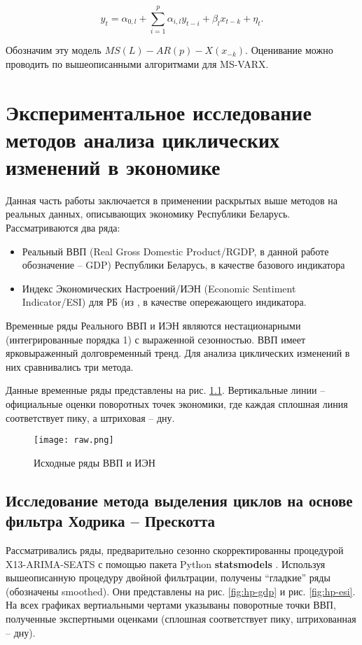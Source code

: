\documentclass[../report.tex]{subfiles}
\begin{document}
	\begin{equation}  
	\label{eq:gen-msarx}
	y_{t} = \alpha_{0,l} + \sum_{i=1}^{p} \alpha_{i,l} y_{t-i} + \beta_{l} x_{t-k} + \eta_{t}.
	\end{equation}
	
	Обозначим эту модель $MS(L)-AR(p)-X({x}_{-k})$. Оценивание можно проводить по вышеописанными алгоритмами для MS-VARX.
	
	
	\chapter{Экспериментальное исследование методов анализа циклических изменений  в экономике}
	
	Данная часть работы заключается в применении раскрытых выше методов на реальных данных, описывающих экономику Республики Беларусь. Рассматриваются два ряда: 
	
	\begin{itemize}
		\item Реальный ВВП (Real Gross Domestic Product/RGDP, в данной работе обозначение – GDP) Республики Беларусь, в качестве базового индикатора
		\item Индекс Экономических Настроений/ИЭН (Economic Sentiment Indicator/ESI) для РБ (из \cite{esiMaking,coursework_babakhin,esiExtra}, в качестве опережающего индикатора.
		
	\end{itemize}
	
	Временные ряды Реального ВВП и ИЭН являются нестационарными (интегрированные порядка 1) с выраженной сезонностью. ВВП имеет ярковыраженный долговременный тренд. Для анализа циклических изменений в них сравнивались три метода.
	
	Данные временные ряды представлены на рис. \ref{fig:raw_cycles}. Вертикальные линии – официальные оценки поворотных точек экономики, где каждая сплошная линия соответствует пику, а штриховая – дну.
	
	\begin{figure}
		\label{fig:raw_cycles}
		\texttt{[image: raw.png]}
		\caption{Исходные ряды ВВП и ИЭН}
	\end{figure} 
	
	
	\section{Исследование метода выделения циклов на основе фильтра Ходрика – Прескотта}
	Рассматривались ряды, предварительно сезонно скорректированны процедурой X13-ARIMA-SEATS с помощью пакета Python \textbf{statsmodels} \cite{statsmodels}. Используя вышеописанную процедуру двойной фильтрации, получены “гладкие” ряды (обозначены smoothed). Они представлены на рис. \ref{fig:hp-gdp} и рис. \ref{fig:hp-esi}. На всех графиках вертиальными чертами указываны поворотные точки ВВП, полученные экспертными оценками (сплошная соответствует пику, штрихованная – дну).
	
\end{document}
